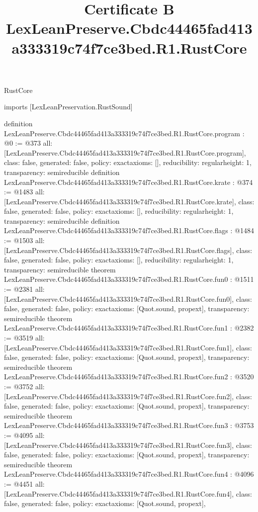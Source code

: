 \begin{lexlean}{RustCore}
\title{Certificate B LexLeanPreserve.Cbdc44465fad413a333319c74f7ce3bed.R1.RustCore}
\begin{coremodule}
imports [LexLeanPreservation.RustSound]

definition LexLeanPreserve.Cbdc44465fad413a333319c74f7ce3bed.R1.RustCore.program : @0 := @373 {
  all: [LexLeanPreserve.Cbdc44465fad413a333319c74f7ce3bed.R1.RustCore.program],
  class: false,
  generated: false,
  policy: exact{axioms: []},
  reducibility: regular{height: 1},
  transparency: semireducible
}
definition LexLeanPreserve.Cbdc44465fad413a333319c74f7ce3bed.R1.RustCore.krate : @374 := @1483 {
  all: [LexLeanPreserve.Cbdc44465fad413a333319c74f7ce3bed.R1.RustCore.krate],
  class: false,
  generated: false,
  policy: exact{axioms: []},
  reducibility: regular{height: 1},
  transparency: semireducible
}
definition LexLeanPreserve.Cbdc44465fad413a333319c74f7ce3bed.R1.RustCore.flags : @1484 := @1503 {
  all: [LexLeanPreserve.Cbdc44465fad413a333319c74f7ce3bed.R1.RustCore.flags],
  class: false,
  generated: false,
  policy: exact{axioms: []},
  reducibility: regular{height: 1},
  transparency: semireducible
}
theorem LexLeanPreserve.Cbdc44465fad413a333319c74f7ce3bed.R1.RustCore.fun0 : @1511 := @2381 {
  all: [LexLeanPreserve.Cbdc44465fad413a333319c74f7ce3bed.R1.RustCore.fun0],
  class: false,
  generated: false,
  policy: exact{axioms: [Quot.sound, propext]},
  transparency: semireducible
}
theorem LexLeanPreserve.Cbdc44465fad413a333319c74f7ce3bed.R1.RustCore.fun1 : @2382 := @3519 {
  all: [LexLeanPreserve.Cbdc44465fad413a333319c74f7ce3bed.R1.RustCore.fun1],
  class: false,
  generated: false,
  policy: exact{axioms: [Quot.sound, propext]},
  transparency: semireducible
}
theorem LexLeanPreserve.Cbdc44465fad413a333319c74f7ce3bed.R1.RustCore.fun2 : @3520 := @3752 {
  all: [LexLeanPreserve.Cbdc44465fad413a333319c74f7ce3bed.R1.RustCore.fun2],
  class: false,
  generated: false,
  policy: exact{axioms: [Quot.sound, propext]},
  transparency: semireducible
}
theorem LexLeanPreserve.Cbdc44465fad413a333319c74f7ce3bed.R1.RustCore.fun3 : @3753 := @4095 {
  all: [LexLeanPreserve.Cbdc44465fad413a333319c74f7ce3bed.R1.RustCore.fun3],
  class: false,
  generated: false,
  policy: exact{axioms: [Quot.sound, propext]},
  transparency: semireducible
}
theorem LexLeanPreserve.Cbdc44465fad413a333319c74f7ce3bed.R1.RustCore.fun4 : @4096 := @4451 {
  all: [LexLeanPreserve.Cbdc44465fad413a333319c74f7ce3bed.R1.RustCore.fun4],
  class: false,
  generated: false,
  policy: exact{axioms: [Quot.sound, propext]},
}
\end{coremodule}
\end{lexlean}
